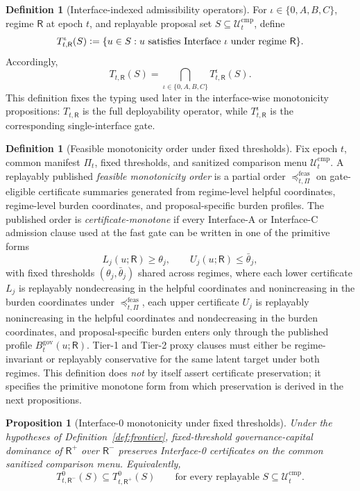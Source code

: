 \documentclass[11pt]{article}
\newtheorem{proposition}[theorem]{Proposition}
\theoremstyle{definition}
\newtheorem{definition}[theorem]{Definition}
\newcommand{\1}{\mathbf{1}}
\newcommand{\Defeq}{\vcentcolon=}
\begin{document}
\begin{definition}[Interface-indexed admissibility operators]\label{def:interface_operators}
For $\iota\in\{0,A,B,C\}$, regime $\mathsf R$ at epoch $t$, and replayable proposal set $S\subseteq\mathcal U_t^{\mathrm{cmp}}$, define
\[
T_{t,\mathsf R}^{\iota}(S)\Defeq \{u\in S: u\text{ satisfies Interface }\iota\text{ under regime }\mathsf R\}.
\]
Accordingly,
\[
T_{t,\mathsf R}(S)=\bigcap_{\iota\in\{0,A,B,C\}} T_{t,\mathsf R}^{\iota}(S).
\]
This definition fixes the typing used later in the interface-wise monotonicity propositions: $T_{t,\mathsf R}$ is the full deployability operator, while $T_{t,\mathsf R}^{\iota}$ is the corresponding single-interface gate.
\end{definition}

\begin{definition}[Feasible monotonicity order under fixed thresholds]\label{def:feasible_order}
Fix epoch $t$, common manifest $\Pi_t$, fixed thresholds, and sanitized comparison menu $\mathcal U_t^{\mathrm{cmp}}$. A replayably published \emph{feasible monotonicity order} is a partial order $\preceq^{\mathrm{feas}}_{t,\Pi}$ on gate-eligible certificate summaries generated from regime-level helpful coordinates, regime-level burden coordinates, and proposal-specific burden profiles. The published order is \emph{certificate-monotone} if every Interface-A or Interface-C admission clause used at the fast gate can be written in one of the primitive forms
\[
L_j(u;\mathsf R)\ge \theta_j,
\qquad
U_j(u;\mathsf R)\le \bar\theta_j,
\]
with fixed thresholds $(\theta_j,\bar\theta_j)$ shared across regimes, where each lower certificate $L_j$ is replayably nondecreasing in the helpful coordinates and nonincreasing in the burden coordinates under $\preceq^{\mathrm{feas}}_{t,\Pi}$, each upper certificate $U_j$ is replayably nonincreasing in the helpful coordinates and nondecreasing in the burden coordinates, and proposal-specific burden enters only through the published profile $B_t^{\mathrm{gov}}(u;\mathsf R)$. Tier-1 and Tier-2 proxy clauses must either be regime-invariant or replayably conservative for the same latent target under both regimes. This definition does \emph{not} by itself assert certificate preservation; it specifies the primitive monotone form from which preservation is derived in the next propositions.
\end{definition}

\begin{proposition}[Interface-0 monotonicity under fixed thresholds]\label{prop:mono_base}
Under the hypotheses of Definition~\ref{def:frontier}, fixed-threshold governance-capital dominance of $\mathsf R^+$ over $\mathsf R^-$ preserves Interface-0 certificates on the common sanitized comparison menu. Equivalently,
\[
T^{0}_{t,\mathsf R^-}(S)\subseteq T^{0}_{t,\mathsf R^+}(S)
\qquad\text{for every replayable }S\subseteq\mathcal U_t^{\mathrm{cmp}}.
\]
\end{proposition}
\end{document}
